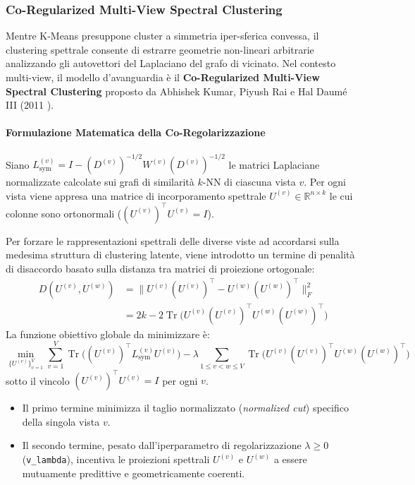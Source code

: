 \FloatBarrier
\subsubsection{Co-Regularized Multi-View Spectral Clustering}
\label{subsec:lab-coreg-spectral}

Mentre K-Means presuppone cluster a simmetria iper-sferica convessa, il clustering spettrale consente di estrarre geometrie non-lineari arbitrarie analizzando gli autovettori del Laplaciano del grafo di vicinato. Nel contesto multi-view, il modello d'avanguardia è il \textbf{Co-Regularized Multi-View Spectral Clustering} proposto da Abhishek Kumar, Piyush Rai e Hal Daum{\'e} III (2011 \cite{kumar2011}).

\paragraph{Formulazione Matematica della Co-Regolarizzazione}
Siano $L_{\text{sym}}^{(v)} = I - (D^{(v)})^{-1/2} W^{(v)} (D^{(v)})^{-1/2}$ le matrici Laplaciane normalizzate calcolate sui grafi di similarità $k$-NN di ciascuna vista $v$. Per ogni vista viene appresa una matrice di incorporamento spettrale $U^{(v)} \in \mathbb{R}^{n \times k}$ le cui colonne sono ortonormali ($(U^{(v)})^\top U^{(v)} = I$).

Per forzare le rappresentazioni spettrali delle diverse viste ad accordarsi sulla medesima struttura di clustering latente, viene introdotto un termine di penalità di disaccordo basato sulla distanza tra matrici di proiezione ortogonale:
\begin{align}
    D(U^{(v)}, U^{(w)}) &= \| U^{(v)}(U^{(v)})^\top - U^{(w)}(U^{(w)})^\top \|_F^2 \nonumber \\
    &= 2k - 2 \operatorname{Tr}\big( U^{(v)}(U^{(v)})^\top U^{(w)}(U^{(w)})^\top \big)
\end{align}
La funzione obiettivo globale da minimizzare è:
\begin{equation}
    \min_{\{U^{(v)}\}_{v=1}^V} \sum_{v=1}^V \operatorname{Tr}\Big( (U^{(v)})^\top L_{\text{sym}}^{(v)} U^{(v)} \Big) - \lambda \sum_{1 \le v < w \le V} \operatorname{Tr}\Big( U^{(v)}(U^{(v)})^\top U^{(w)}(U^{(w)})^\top \Big)
    \label{eq:coreg-spectral-objective}
\end{equation}
sotto il vincolo $(U^{(v)})^\top U^{(v)} = I$ per ogni $v$.
\begin{itemize}
    \item Il primo termine minimizza il taglio normalizzato (\textit{normalized cut}) specifico della singola vista $v$.
    \item Il secondo termine, pesato dall'iperparametro di regolarizzazione $\lambda \ge 0$ (\texttt{v\_lambda}), incentiva le proiezioni spettrali $U^{(v)}$ e $U^{(w)}$ a essere mutuamente predittive e geometricamente coerenti.
\end{itemize}

